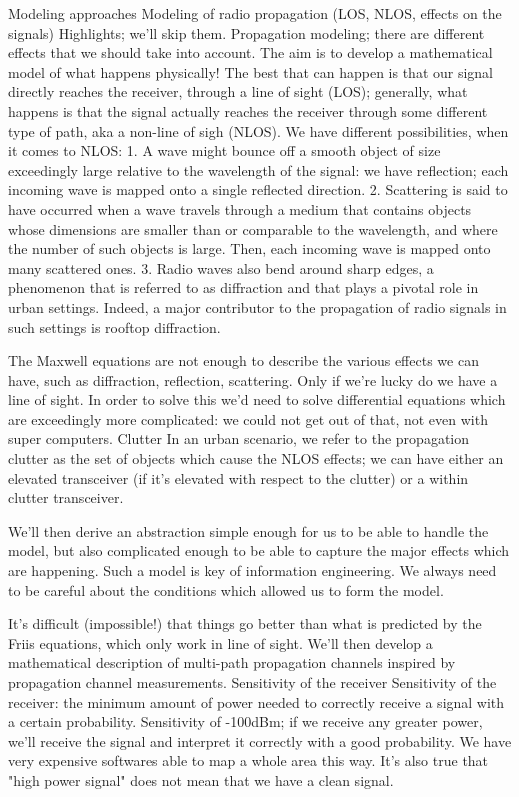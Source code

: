 {{{Modeling approaches Modeling of radio propagation (LOS, NLOS, effects on the signals)
Highlights; we'll skip them.
Propagation modeling; there are different effects that we should take into account. The aim is to develop a mathematical model of what happens physically!
The best that can happen is that our signal directly reaches the receiver, through a line of sight (LOS); generally, what happens is that the signal actually reaches the receiver through some different type of path, aka a non-line of sigh (NLOS).
We have different possibilities, when it comes to NLOS:
1. A wave might bounce off a smooth object of size exceedingly large relative to the wavelength of the signal: we have reflection; each incoming wave is mapped onto a single reflected direction.
2. Scattering is said to have occurred when a wave travels through a medium that contains objects whose dimensions are smaller than or comparable to the wavelength,
and where the number of such objects is large. Then, each incoming wave is mapped onto many scattered ones.
3. Radio waves also bend around sharp edges, a phenomenon that is referred to as diffraction and that plays a pivotal role in urban settings. Indeed, a major contributor to the propagation of radio signals in such settings is rooftop diffraction.

The Maxwell equations are not enough to describe the various effects we can have, such as diffraction, reflection, scattering. Only if we're lucky do we have a line of sight.
In order to solve this we'd need to solve differential equations which are exceedingly more complicated: we could not get out of that, not even with super computers.
Clutter In an urban scenario, we refer to the propagation clutter as the set of objects which cause the NLOS effects; we can have either an elevated transceiver (if it's elevated with respect to the clutter) or a within clutter transceiver.

We'll then derive an abstraction simple enough for us to be able to handle the model, but also complicated enough to be able to capture the major effects which are happening.
Such a model is key of information engineering.
We always need to be careful about the conditions which allowed us to form the model.

It's difficult (impossible!) that things go better than what is predicted by the Friis equations, which only work in line of sight.
We'll then develop a mathematical description of multi-path propagation channels inspired by propagation channel measurements.
Sensitivity of the receiver Sensitivity of the receiver: the minimum amount of power needed to correctly receive a signal with a certain probability.
Sensitivity of -100dBm; if we receive any greater power, we'll receive the signal and interpret it correctly with a good probability.
We have very expensive softwares able to map a whole area this way.
It's also true that "high power signal" does not mean that we have a clean signal.

}}}
